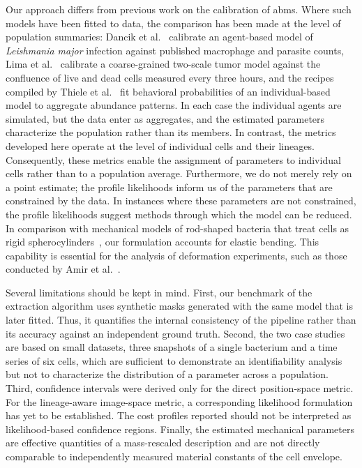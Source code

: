 Our approach differs from previous work on the calibration of \acp{abm}.
Where such models have been fitted to data, the comparison has been made at the level of population
summaries: Dancik et al.~\cite{Dancik2010} calibrate an agent-based model of \textit{Leishmania
major} infection against published macrophage and parasite counts, Lima et al.~\cite{Lima2021}
calibrate a coarse-grained two-scale tumor model against the confluence of live and dead cells
measured every three hours, and the recipes compiled by Thiele et al.~\cite{Thiele2014} fit
behavioral probabilities of an individual-based model to aggregate abundance patterns.
In each case the individual agents are simulated, but the data enter as aggregates, and the
estimated parameters characterize the population rather than its members.
In contrast, the metrics developed here operate at the level of individual cells and their lineages.
Consequently, these metrics enable the assignment of parameters to individual cells rather than to a
population average.
Furthermore, we do not merely rely on a point estimate; the profile likelihoods inform us of the
parameters that are constrained by the data.
In instances where these parameters are not constrained, the profile likelihoods suggest methods
through which the model can be reduced.
In comparison with mechanical models of rod-shaped bacteria that treat cells as rigid
spherocylinders~\cite{Rudge2012,Winkle2017}, our formulation accounts for elastic bending.
This capability is essential for the analysis of deformation experiments, such as those conducted by
Amir et al.~\cite{Amir2014,Amir2014_2}.

Several limitations should be kept in mind.
First, our benchmark of the extraction algorithm uses synthetic masks generated with the same model
that is later fitted.
Thus, it quantifies the internal consistency of the pipeline rather than its accuracy against an
independent ground truth.
Second, the two case studies are based on small datasets, three snapshots of a single bacterium and
a time series of six cells, which are sufficient to demonstrate an identifiability analysis but not
to characterize the distribution of a parameter across a population.
Third, confidence intervals were derived only for the direct position-space metric.
For the lineage-aware image-space metric, a corresponding likelihood formulation has yet to be
established.
The cost profiles reported should not be interpreted as likelihood-based confidence regions.
Finally, the estimated mechanical parameters are effective quantities of a mass-rescaled description
and are not directly comparable to independently measured material constants of the cell envelope.


